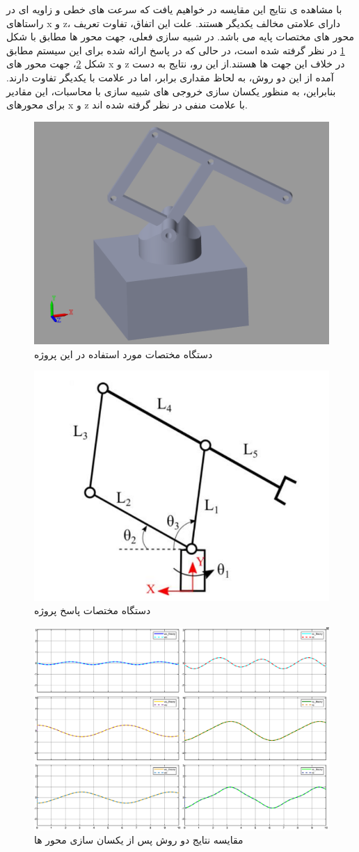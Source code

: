 \FloatBarrier
با مشاهده ی نتایج این مقایسه در خواهیم یافت که سرعت های خطی و زاویه ای در راستاهای x و z، دارای علامتی مخالف یکدیگر هستند. علت این اتفاق، تفاوت تعریف محور های مختصات پایه می باشد. در شبیه سازی فعلی، جهت محور ها مطابق با شکل   \ref{fig:robot} در نظر گرفته شده است، در حالی که در پاسخ ارائه شده برای این سیستم مطابق شکل \ref{fig:solutionaxes}، جهت محور های x و z در خلاف این جهت ها هستند.از این رو، نتایج به دست آمده از این دو روش، به لحاظ مقداری برابر، اما در علامت با یکدیگر تفاوت دارند.
بنابراین، به منظور یکسان سازی خروجی های شبیه سازی با محاسبات، این مقادیر برای محورهای x و z با علامت منفی در نظر گرفته شده اند.

\begin{figure}[htbp]
	\centering
	\includegraphics[width=0.7\linewidth]{../img/robot}
	\caption{دستگاه مختصات مورد استفاده در این پروژه}
	\label{fig:robot}
\end{figure}
\begin{figure}[htbp]
	\centering
	\includegraphics[width=0.52\linewidth]{../img/Solution_Axes}
	\caption{دستگاه مختصات پاسخ پروژه}
	\label{fig:solutionaxes}
\end{figure}
\begin{figure}[htbp]
	\centering
	\includegraphics[width=0.7\linewidth]{"../img/compare plot_after_minus"}
	\caption{مقایسه نتایج دو روش پس از یکسان سازی محور ها}
	\label{fig:compare-plotafterminus}
\end{figure}
\FloatBarrier
